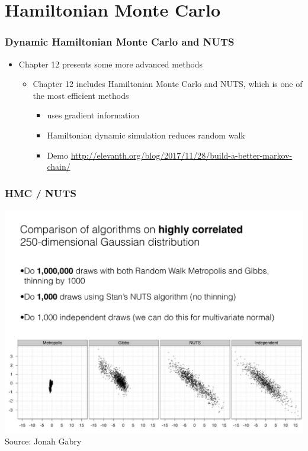 \documentclass[10pt]{beamer}
\begin{document}

\section{Hamiltonian Monte Carlo}
\frame{\sectionpage}









\begin{frame}

\frametitle{ Dynamic Hamiltonian Monte Carlo and NUTS}

  \begin{itemize}
  \item Chapter 12 presents some more advanced methods
    \begin{itemize}
    \item Chapter 12 includes Hamiltonian Monte Carlo and NUTS, which
      is one of the most efficient methods
      \begin{itemize}
      \item uses gradient information
      \item Hamiltonian dynamic simulation reduces random walk
   \item Demo {\small \url{http://elevanth.org/blog/2017/11/28/build-a-better-markov-chain/}}
      \end{itemize}
    \end{itemize}
  \end{itemize}

\end{frame}

\begin{frame}

\frametitle{ HMC / NUTS}

  \vspace{-.5\baselineskip}
  \includegraphics[width=\textwidth,clip]{figs/N250.pdf}\\
  Source: Jonah Gabry

\end{frame}
\end{document}
